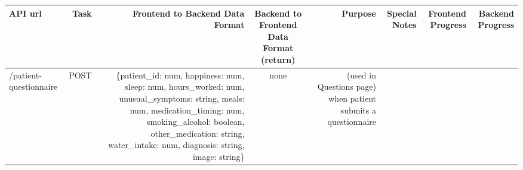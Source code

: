 \documentclass[]{book}
\begin{document}
\begin{longtable}[]{@{}lrrcrrrr@{}}
\toprule
\begin{minipage}[b]{0.12\columnwidth}\raggedright\strut
API url\strut
\end{minipage} & \begin{minipage}[b]{0.13\columnwidth}\raggedleft\strut
Task\strut
\end{minipage} & \begin{minipage}[b]{0.13\columnwidth}\raggedleft\strut
Frontend to Backend Data Format\strut
\end{minipage} & \begin{minipage}[b]{0.14\columnwidth}\centering\strut
Backend to Frontend Data Format (return)\strut
\end{minipage} & \begin{minipage}[b]{0.06\columnwidth}\raggedleft\strut
Purpose\strut
\end{minipage} & \begin{minipage}[b]{0.06\columnwidth}\raggedleft\strut
Special Notes\strut
\end{minipage} & \begin{minipage}[b]{0.06\columnwidth}\raggedleft\strut
Frontend Progress\strut
\end{minipage} & \begin{minipage}[b]{0.06\columnwidth}\raggedleft\strut
Backend Progress\strut
\end{minipage}\tabularnewline
\midrule
\endhead
\begin{minipage}[t]{0.12\columnwidth}\raggedright\strut
/patient-questionnaire\strut
\end{minipage} & \begin{minipage}[t]{0.13\columnwidth}\raggedleft\strut
POST\strut
\end{minipage} & \begin{minipage}[t]{0.13\columnwidth}\raggedleft\strut
\{patient\_id: num, happiness: num, sleep: num, hours\_worked: num,
unusual\_symptoms: string, meals: num, medication\_timing: num,
smoking\_alcohol: boolean, other\_medication: string, water\_intake:
num, diagnosis: string, image: string\}\strut
\end{minipage} & \begin{minipage}[t]{0.14\columnwidth}\centering\strut
none\strut
\end{minipage} & \begin{minipage}[t]{0.06\columnwidth}\raggedleft\strut
(used in Questions page) when patient submits a questionnaire\strut
\end{minipage} & \begin{minipage}[t]{0.06\columnwidth}\raggedleft\strut

\end{minipage}
\end{longtable}
\end{document}
